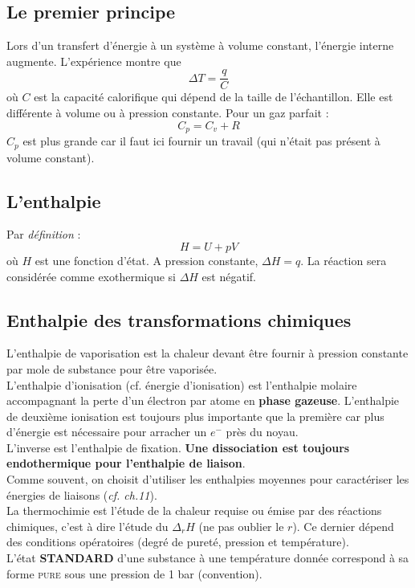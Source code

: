 \documentclass	[11pt, a4paper, openany]{book}
\begin{document}
\subsection{Le premier principe}
Lors d'un transfert d'énergie à un système à volume constant, l'énergie interne augmente. L'expérience montre que 
$$\Delta T = \frac{q}{C}$$
où $C$ est la capacité calorifique qui dépend de la taille de l'échantillon. Elle est différente à volume ou à pression constante. Pour un gaz parfait :
$$C_p = C_v + R$$
$C_p$ est plus grande car il faut ici fournir un travail (qui n'était pas présent à volume constant).


\subsection{L'enthalpie}
Par \textit{définition} : 
$$H = U + pV$$
où $H$ est une fonction d'état. A pression constante, $\Delta H = q$. La réaction sera considérée comme exothermique si $\Delta H$ est négatif.

\subsection{Enthalpie des transformations chimiques}
L'enthalpie de vaporisation est la chaleur devant être fournir à pression constante par mole de substance pour être vaporisée.\\

L'enthalpie d'ionisation (cf. énergie d'ionisation) est l'enthalpie molaire accompagnant la perte d'un électron par atome en \textbf{phase gazeuse}. L'enthalpie de deuxième ionisation est toujours plus importante que la première car plus d'énergie est nécessaire pour arracher un $e^-$ près du noyau.\\
L'inverse est l'enthalpie de fixation. \textbf{Une dissociation est toujours endothermique pour l'enthalpie de liaison}.\\

Comme souvent, on choisit d'utiliser les enthalpies moyennes pour caractériser les énergies de liaisons (\textit{cf. ch.11}).\\

La thermochimie est l'étude de la chaleur requise ou émise par des réactions chimiques, c'est à dire l'étude du $\Delta_r H$ (ne pas oublier le $r$). Ce dernier dépend des conditions opératoires (degré de pureté, pression et température).\\
L'état \textbf{STANDARD} d'une substance à une température donnée correspond à sa forme \textsc{pure} sous une pression de 1 bar (convention).\\
\end{document}
